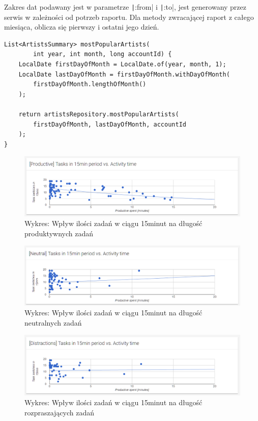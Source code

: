 \documentclass[openright]{xmgr}
\begin{document}
    Zakres dat podawany jest w parametrze \texttt|:from| i \texttt|:to|,
    jest generowany przez serwis w zależności od potrzeb raportu.
    Dla metody zwracającej raport z całego miesiąca, oblicza się pierwszy i ostatni jego dzień.

    \begin{verbatim}
List<ArtistsSummary> mostPopularArtists(
        int year, int month, long accountId) {
    LocalDate firstDayOfMonth = LocalDate.of(year, month, 1);
    LocalDate lastDayOfMonth = firstDayOfMonth.withDayOfMonth(
        firstDayOfMonth.lengthOfMonth()
    );

    return artistsRepository.mostPopularArtists(
        firstDayOfMonth, lastDayOfMonth, accountId
    );
}
    \end{verbatim}

    \begin{figure}
        \includegraphics[width=\linewidth]{fig/ui/chart-tasks-productive.png}
        \caption{Wykres: Wpływ ilości zadań w ciągu 15minut na długość produktywnych zadań}
        \label{fig:ui:chart-tasks-productive}
    \end{figure}

    \begin{figure}
        \includegraphics[width=\linewidth]{fig/ui/chart-tasks-neutral.png}
        \caption{Wykres: Wpływ ilości zadań w ciągu 15minut na długość neutralnych zadań}
        \label{fig:ui:chart-tasks-neutral}
    \end{figure}

    \begin{figure}
        \includegraphics[width=\linewidth]{fig/ui/chart-tasks-distractions.png}
        \caption{Wykres: Wpływ ilości zadań w ciągu 15minut na długość rozpraszających zadań}
        \label{fig:ui:chart-tasks-distractions}
    \end{figure}
\end{document}
